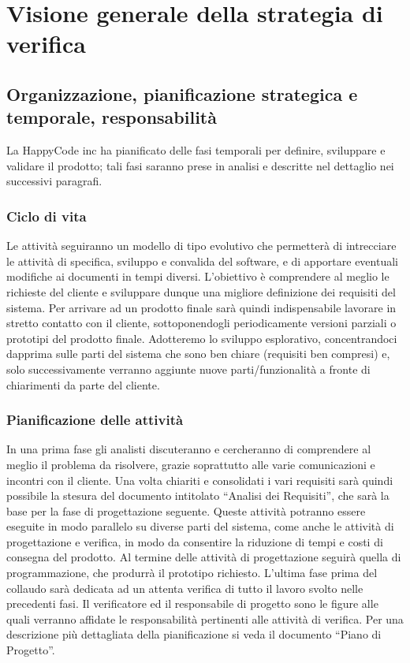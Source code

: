 \documentclass[11pt,titlepage,a4paper]{report}
\begin{document}
\chapter[Strategia di verifica]{Visione generale della strategia di verifica}
\section[Organizzazione, pianificazione, responsabilit\`a]{Organizzazione, pianificazione strategica e temporale, responsabilit\`a}
La HappyCode inc ha  pianificato delle fasi temporali per definire, sviluppare e validare il prodotto; tali fasi saranno prese in analisi e descritte nel dettaglio nei successivi paragrafi.

\subsection{Ciclo di vita}
Le attivit\`a seguiranno un modello di tipo evolutivo che permetter\`a di intrecciare le attivit\`a di specifica, sviluppo e convalida del software, e di apportare eventuali modifiche ai documenti in tempi diversi. L'obiettivo \`e comprendere al meglio le richieste del cliente e sviluppare dunque una migliore definizione dei requisiti del sistema. Per arrivare ad un prodotto finale sar\`a quindi indispensabile lavorare in stretto contatto con il cliente, sottoponendogli periodicamente versioni parziali o prototipi del prodotto finale. Adotteremo lo sviluppo esplorativo, concentrandoci dapprima sulle parti del sistema che sono ben chiare (requisiti ben compresi) e, solo successivamente verranno aggiunte nuove parti/funzionalit\`a a fronte di chiarimenti da parte del cliente. 
\subsection{Pianificazione delle attivit\`a}
In una prima fase gli analisti discuteranno e cercheranno di comprendere al meglio il problema da risolvere, grazie soprattutto alle varie comunicazioni e incontri con il cliente. Una volta chiariti e consolidati i vari requisiti sar\`a quindi possibile la stesura del documento intitolato ``Analisi dei Requisiti'', che sar\`a la base per la fase di progettazione seguente. Queste attivit\`a potranno essere eseguite in modo parallelo su diverse parti del sistema, come anche le attivit\`a di progettazione e verifica, in modo da consentire la riduzione di tempi e costi di consegna del prodotto. Al termine delle attivit\`a di progettazione seguir\`a quella di programmazione, che produrr\`a il prototipo richiesto. L'ultima fase prima del collaudo sar\`a dedicata ad un attenta verifica di tutto il lavoro svolto nelle precedenti fasi. Il verificatore ed il responsabile di progetto sono le figure alle quali verranno affidate le responsabilit\`a pertinenti alle attivit\`a di verifica. Per una descrizione pi\`u dettagliata della pianificazione si veda il documento ``Piano di Progetto''.
\end{document}
